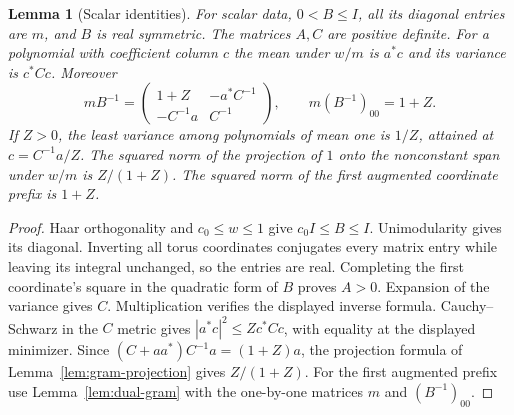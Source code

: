 \documentclass[reqno,a4paper,12pt]{amsart}
\newtheorem{lemma}[theorem]{Lemma}
\theoremstyle{definition}
\begin{document}
\begin{lemma}[Scalar identities]\label{lem:scalar-identities}
For scalar data, $0<B\le I$, all its diagonal entries are $m$, and
$B$ is real symmetric. The matrices $A,C$ are positive definite.
For a polynomial with coefficient column $c$ the mean under $w/m$ is
$a^*c$ and its variance is $c^*Cc$. Moreover
\[
 mB^{-1}=
 \begin{pmatrix}1+Z&-a^*C^{-1}\\-C^{-1}a&C^{-1}\end{pmatrix},
 \qquad m(B^{-1})_{00}=1+Z.
\]
If $Z>0$, the least variance among polynomials of mean one is $1/Z$,
attained at $c=C^{-1}a/Z$. The squared norm of the projection of $1$
onto the nonconstant span under $w/m$ is $Z/(1+Z)$.
The squared norm of the first augmented coordinate prefix is $1+Z$.
\end{lemma}
\begin{proof}
Haar orthogonality and $c_0\le w\le1$ give $c_0I\le B\le I$.
Unimodularity gives its diagonal. Inverting all torus coordinates
conjugates every matrix entry while leaving its integral unchanged,
so the entries are real. Completing the first coordinate's square
in the quadratic form of $B$ proves $A>0$.
Expansion of the variance gives $C$. Multiplication verifies the
displayed inverse formula. Cauchy--Schwarz in the $C$ metric gives
$|a^*c|^2\le Zc^*Cc$, with equality at the displayed minimizer.
Since $(C+aa^*)C^{-1}a=(1+Z)a$, the projection formula of
Lemma~\ref{lem:gram-projection} gives $Z/(1+Z)$.
For the first augmented prefix use
Lemma~\ref{lem:dual-gram} with the one-by-one matrices $m$ and
$(B^{-1})_{00}$.
\end{proof}
\end{document}
